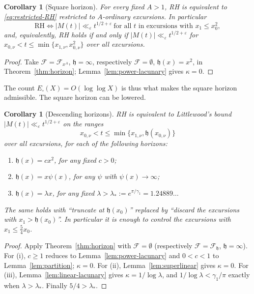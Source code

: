\documentclass[11pt]{amsart}
\numberwithin{equation}{section}
\theoremstyle{plain}
\newtheorem{corollary}[theorem]{Corollary}
\theoremstyle{definition}
\theoremstyle{remark}
\newcommand{\eps}{\varepsilon}
\newcommand{\F}{\mathcal{F}}
\begin{document}
\begin{corollary}[Square horizon]
\label{cor:power-ordinary-RH}
\label{cor:square-truncated-RH}
For every fixed $A>1$, RH is equivalent to \eqref{eq:restricted-RH}
restricted to $A$-ordinary excursions. In particular
\begin{equation}
\label{eq:square-horizon-RH}
\boxed{\ \mathrm{RH}\iff
|M(t)|\ll_\eps t^{1/2+\eps}
\ \text{for all $t$ in excursions with }x_1\le x_0^2,\ }
\end{equation}
and, equivalently, RH holds if and only if
$|M(t)|\ll_\eps t^{1/2+\eps}$ for $x_{0,\nu}<t\le\min\{x_{1,\nu},x_{0,\nu}^2\}$
over all excursions.
\end{corollary}

\begin{proof}
Take $\F=\F_{x^A}$, $\mathfrak h=\infty$, respectively $\F=\emptyset$, $\mathfrak h(x)=x^2$, in
Theorem~\ref{thm:horizon}; Lemma~\ref{lem:power-lacunary} gives
$\kappa=0$.
\end{proof}

The count $E_\square(X)=O(\log\log X)$ is thus what makes the square
horizon admissible. The square horizon can be lowered.

\begin{corollary}[Descending horizons]
\label{cor:descending}
\label{cor:linear-ordinary-RH}
RH is equivalent to Littlewood's bound
$|M(t)|\ll_\eps t^{1/2+\eps}$ on the ranges
\[
x_{0,\nu}<t\le\min\{x_{1,\nu},\mathfrak h(x_{0,\nu})\}
\]
over all excursions, for each of the following horizons:
\begin{enumerate}[label=\textup{(\roman*)}]
\item $\mathfrak h(x)=cx^2$, for any fixed $c>0$;
\item $\mathfrak h(x)=x\psi(x)$, for any $\psi$ with $\psi(x)\to\infty$;
\item $\mathfrak h(x)=\lambda x$, for any fixed $\lambda>\lambda_*:=e^{\pi/\gamma_1}=1.24889\ldots$
\end{enumerate}
The same holds with ``truncate at $\mathfrak h(x_0)$'' replaced by ``discard the
excursions with $x_1>\mathfrak h(x_0)$''. In particular it is enough to control the
excursions with $x_1\le\frac54x_0$.
\end{corollary}

\begin{proof}
Apply Theorem~\ref{thm:horizon} with $\F=\emptyset$ (respectively
$\F=\F_{\mathfrak h}$, $\mathfrak h=\infty$). For (i), $c\ge1$ reduces to
Lemma~\ref{lem:power-lacunary} and $0<c<1$ to Lemma~\ref{lem:partition};
$\kappa=0$. For (ii), Lemma~\ref{lem:superlinear} gives $\kappa=0$. For
(iii), Lemma~\ref{lem:linear-lacunary} gives $\kappa=1/\log\lambda$, and
$1/\log\lambda<\gamma_1/\pi$ exactly when $\lambda>\lambda_*$. Finally
$5/4>\lambda_*$.
\end{proof}
\end{document}
